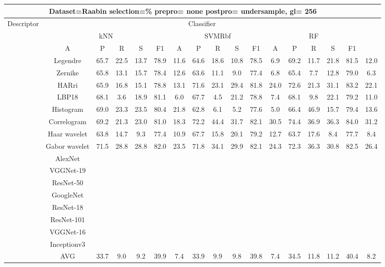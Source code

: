 \documentclass[12pt,italian]{article}
\begin{document}
\begin{tiny}
\begin{longtable}{lcccccccccccccccc}
\toprule
\multicolumn{16}{c}{Dataset=Raabin selection=\% prepro= none postpro= undersample, gl= 256} \\ 
\toprule
Descriptor & \multicolumn{15}{c}{Classifier} \\ 
& \multicolumn{5}{c}{kNN} & \multicolumn{5}{c}{SVMRbf} & \multicolumn{5}{c}{RF} \\ 
& A & P & R & S & F1 & A & P & R & S & F1 & A & P & R & S & F1 \\ 
\midrule
& Legendre & 65.7 & 22.5 & 13.7 & 78.9 & 11.6 & 64.6 & 18.6 & 10.8 & 78.5 &  6.9 & 69.2 & 11.7 & 21.8 & 81.5 & 12.0 \\ 
& Zernike & 65.8 & 13.1 & 15.7 & 78.4 & 12.6 & 63.6 & 11.1 &  9.0 & 77.4 &  6.8 & 65.4 &  7.7 & 12.8 & 79.0 &  6.3 \\ 
& HARri & 65.9 & 16.8 & 15.1 & 78.8 & 13.1 & 71.6 & 23.1 & 29.4 & 81.8 & 24.0 & 72.6 & 21.3 & 31.1 & 83.2 & 22.1 \\ 
& LBP18 & 68.1 &  3.6 & 18.9 & 81.1 &  6.0 & 67.7 &  4.5 & 21.2 & 78.8 &  7.4 & 68.1 &  9.8 & 22.1 & 79.2 & 11.0 \\ 
& Histogram & 69.0 & 23.3 & 23.5 & 80.4 & 21.8 & 62.8 &  6.1 &  5.2 & 77.6 &  5.0 & 66.4 & 46.9 & 15.7 & 79.4 & 13.6 \\ 
& Correlogram & 69.2 & 21.3 & 23.0 & 81.0 & 18.3 & 72.2 & 44.4 & 31.7 & 82.1 & 30.5 & 74.4 & 36.9 & 36.3 & 84.0 & 31.2 \\ 
& Haar wavelet & 63.8 & 14.7 &  9.3 & 77.4 & 10.9 & 67.7 & 15.8 & 20.1 & 79.2 & 12.7 & 63.7 & 17.6 &  8.4 & 77.7 &  8.4 \\ 
& Gabor wavelet & 71.5 & 28.8 & 28.8 & 82.0 & 23.5 & 71.8 & 34.1 & 29.9 & 82.1 & 24.3 & 72.3 & 36.3 & 30.8 & 82.5 & 26.4 \\ 
& AlexNet \\ 
& VGGNet-19 \\ 
& ResNet-50 \\ 
& GoogleNet \\ 
& ResNet-18 \\ 
& ResNet-101 \\ 
& VGGNet-16 \\ 
& Inceptionv3 \\ 
\hline
& AVG & 33.7 &  9.0 &  9.2 & 39.9 &  7.4 & 33.9 &  9.9 &  9.8 & 39.8 &  7.4 & 34.5 & 11.8 & 11.2 & 40.4 &  8.2 \\ 
\hline
\bottomrule
\end{longtable} 


\end{tiny}
\end{document}
